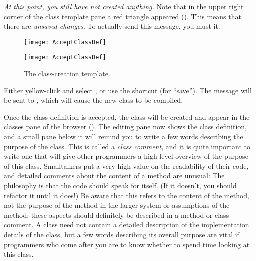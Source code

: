 \documentclass[a4paper,10pt,twoside]{book}
\begin{document}
\emph{At this point, you still have not created anything.}
Note that in the upper right corner of the class template pane a red triangle appeared ().
This means that there are \emph{unsaved changes}.
To actually send this message, you must  it.

\begin{figure}[h!t]
\ifluluelse
	{\centerline {\texttt{[image: AcceptClassDef]}}}
	{\centerline {\texttt{[image: AcceptClassDef]}}}
\caption{The class-creation template.
\label{fig:acceptClassDef}}
\end{figure}

Either yellow-click and select , or use the shortcut  (for ``save'').
The message will be sent to , which will cause the new class to be compiled.

Once the class definition is accepted, the class will be created and appear in the classes pane of the browser ().
The editing pane now shows the class definition, and a small pane below it will remind you to write a few words describing the purpose of the class.
This is called a \emph{class comment}, and it is quite important to write one that will give other programmers a high-level overview of the purpose of this class.
Smalltalkers put a very high value on the readability of their code, and detailed comments about the content of a method are unusual:
The philosophy is that the code should speak for itself.
(If it doesn't, you should refactor it until it does!) 
Be aware that this refers to the content of the method, not the purpose of the method in the larger system or assumptions of the method; these aspects should definitely be described in a method or class comment.
A class  need not contain a detailed description of the implementation details of the class, but a few words describing its overall purpose are vital if programmers who come after you are to know whether to spend time looking at this class. 
\end{document}

